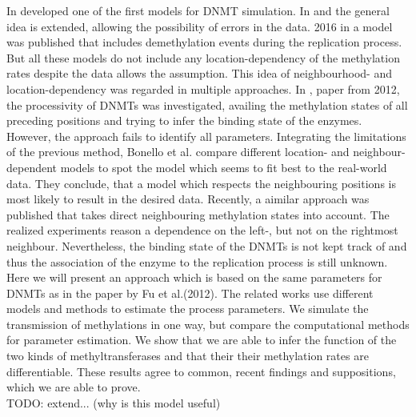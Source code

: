 In \cite{Genereaux} developed one of the first models for \ac{DNMT} simulation. In \cite{errors} and \cite{Wolf} the general idea is extended, allowing the possibility of errors in the data. 2016 in \cite{Giehr} a model was published that includes demethylation events during the replication process. But all these models do not include any location-dependency of the methylation rates despite the data allows the assumption.\cite{errors}\newline
This idea of neighbourhood- and location-dependency was regarded in multiple approaches. In \cite{Fu}, paper from 2012, the processivity of \acp{DNMT} was investigated, availing the methylation states of all preceding positions and trying to infer the binding state of the enzymes. However, the approach fails to identify all parameters.\newline
Integrating the limitations of the previous method, Bonello et al.\cite{Bonello} compare different location- and neighbour-dependent models to spot the model which seems to fit best to the real-world data. They conclude, that a model which respects the neighbouring positions is most likely to result in the desired data.\newline
Recently, a aimilar approach\cite{Lueck} was published that takes direct neighbouring methylation states into account. The realized experiments reason a dependence on the left-, but not on the rightmost neighbour. Nevertheless, the binding state of the \acp{DNMT} is not kept track of and thus the association of the enzyme to the replication process is still unknown.\\

Here we will present an approach which is based on the same parameters for \acp{DNMT} as in the paper by Fu et al.(2012)\cite{Fu}. The related works use different models and methods to estimate the process parameters. We simulate the transmission of methylations in one way, but compare the computational methods for parameter estimation. We show that we are able to infer the function of the two kinds of methyltransferases and that their their methylation rates are differentiable. These results agree to common, recent findings and suppositions, which we are able to prove.\\
TODO: extend... (why is this model useful)\\